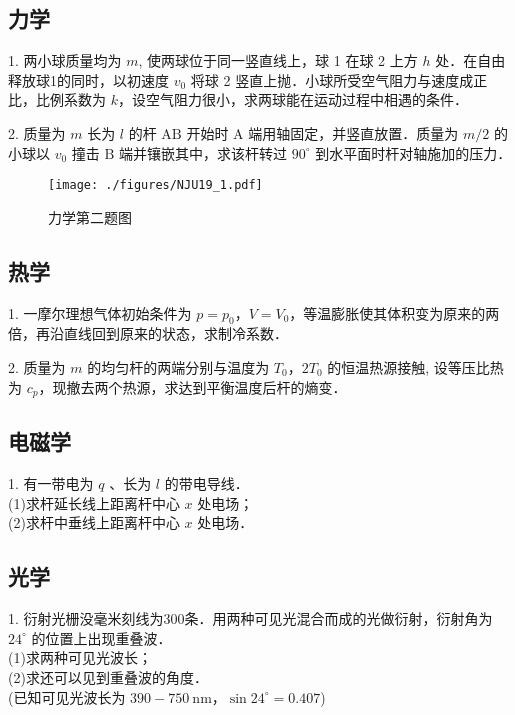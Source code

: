 
\subsection{力学}
1. 两小球质量均为 $m$, 使两球位于同一竖直线上，球 1 在球 2 上方 $h$ 处．在自由释放球1的同时，以初速度 $v_{0}$ 将球 2 竖直上抛．小球所受空气阻力与速度成正比，比例系数为 $k$，设空气阻力很小，求两球能在运动过程中相遇的条件．

2. 质量为 $m$ 长为 $l$ 的杆 $\mathrm{AB}$ 开始时 $\mathrm{A}$ 端用轴固定，并竖直放置．质量为 $m / 2$ 的小球以 $v_{0}$ 撞击 $\mathrm{B}$ 端并镶嵌其中，求该杆转过 $90^{\circ}$ 到水平面时杆对轴施加的压力．
\begin{figure}[ht]
\centering
\texttt{[image: ./figures/NJU19\_1.pdf]}
\caption{力学第二题图} \label{NJU19_fig1}
\end{figure}
\subsection{热学}
1. 一摩尔理想气体初始条件为 $p=p_{0}$，$V=V_{0}$，等温膨胀使其体积变为原来的两倍，再沿直线回到原来的状态，求制冷系数．

2. 质量为 $m$ 的均匀杆的两端分别与温度为 $T_{0}$，$2T_{0}$ 的恒温热源接触, 设等压比热为 $c_{p}$，现撤去两个热源，求达到平衡温度后杆的熵变．
\subsection{电磁学}
1. 有一带电为 $q$ 、长为 $l$ 的带电导线．\\
(1)求杆延长线上距离杆中心 $x$ 处电场；\\
(2)求杆中垂线上距离杆中心 $x$ 处电场．
\subsection{光学}
1. 衍射光栅没毫米刻线为300条．用两种可见光混合而成的光做衍射，衍射角为 $24^{\circ}$ 的位置上出现重叠波．\\
(1)求两种可见光波长；\\
(2)求还可以见到重叠波的角度．\\
(已知可见光波长为 $390-750 \mathrm{~nm}$，$\sin 24^{\circ}=0.407$)
